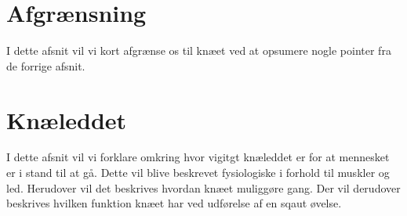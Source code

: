 \section{Afgrænsning}
I dette afsnit vil vi kort afgrænse os til knæet ved at opsumere nogle pointer fra de forrige afsnit.

\section{Knæleddet}
I dette afsnit vil vi forklare omkring hvor vigitgt knæleddet er for at mennesket er i stand til at gå. Dette vil blive beskrevet fysiologiske i forhold til muskler og led. Herudover vil det beskrives hvordan knæet muliggøre gang. Der vil derudover beskrives hvilken funktion knæet har ved udførelse af en sqaut øvelse.
